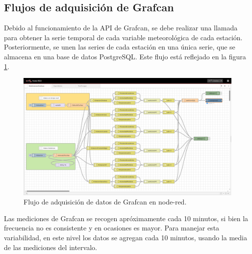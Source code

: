 \subsection{Flujos de adquisición de Grafcan}
Debido al funcionamiento de la API de Grafcan, se debe realizar una llamada para obtener la serie temporal de cada variable meteorológica de cada estación.
Posteriormente, se unen las series de cada estación en una única serie, que se almacena en una base de datos PostgreSQL. Este flujo está reflejado en la figura \ref{grafcan_flows}.
\begin{figure}[htb]
   \centering
   \includegraphics[width=1\linewidth]{images/node-red_grafcan.png}
   \caption{Flujo de adquisición de datos de Grafcan en node-red.}
   \label{grafcan_flows}
\end{figure}

Las mediciones de Grafcan se recogen apróximamente cada 10 minutos, si bien la frecuencia no es consistente y en ocasiones es mayor. Para manejar esta variabilidad, 
en este nivel los datos se agregan cada 10 minutos, usando la media de las mediciones del intervalo.

